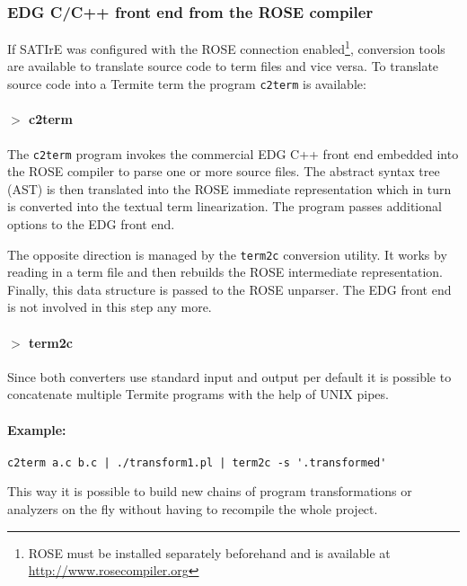 \documentclass[10pt,twoside]{scrreprt}
\begin{document}
\subsubsection{EDG C/C++ front end from the ROSE compiler}
If SATIrE was configured with the ROSE connection
enabled\footnote{ROSE must be installed separately beforehand and is
  available at \url{http://www.rosecompiler.org}}, conversion tools
are available to translate source code to term files and vice versa.
To translate source code into a Termite term the program
\texttt{c2term} is available:

\paragraph{$>$ c2term}
The \texttt{c2term} program invokes the commercial EDG C++ front end
embedded into the ROSE compiler to parse one or more source files. The
abstract syntax tree (AST) is then translated into the ROSE immediate
representation which in turn is converted into the textual term
linearization. The program passes additional options to the EDG front
end.

The opposite direction is managed by the \texttt{term2c} conversion
utility. It works by reading in a term file and then rebuilds the ROSE
intermediate representation. Finally, this data structure is passed to
the ROSE unparser. The EDG front end is not involved in this step any
more.

\paragraph{$>$ term2c}

\bigskip

Since both converters use standard input and output per default it is
possible to concatenate multiple Termite programs with the help of
UNIX pipes.

\paragraph{Example:}
\begin{verbatim}
c2term a.c b.c | ./transform1.pl | term2c -s '.transformed'
\end{verbatim}
This way it is possible to build new chains of program transformations
or analyzers on the fly without having to recompile the whole project.
\end{document}
